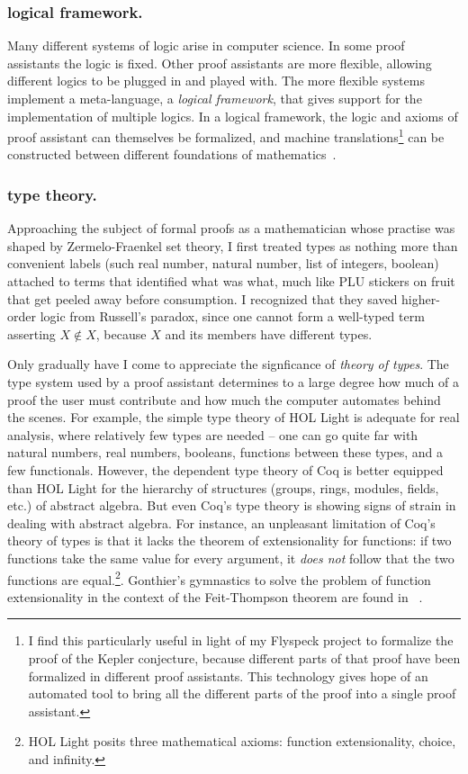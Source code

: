 \documentclass{llncs}
\begin{document}
\subsubsection{logical framework.} 
Many different systems of logic arise in computer science.  In some
proof assistants the logic is fixed. Other proof assistants are more
flexible, allowing different logics to be plugged in and played with.
The more flexible systems implement a meta-language, a {\it logical
  framework}, that gives support for the implementation of multiple
logics.  In a logical framework, the logic and axioms of proof
assistant can themselves be formalized, and machine
translations\footnote{I find this particularly useful in light of my
  Flyspeck project to formalize the proof of the Kepler conjecture,
  because different parts of that proof have been formalized in
  different proof assistants.  This technology gives hope of an
  automated tool to bring all the different parts of the proof into a
  single proof assistant.} can be constructed between different
foundations of mathematics~\cite{IRFF}.

\subsubsection{type theory.}

Approaching the subject of formal proofs as a mathematician whose
practise was shaped by Zermelo-Fraenkel set theory, I first treated
types as nothing more than convenient labels (such real number,
natural number, list of integers, boolean) attached to terms that
identified what was what, much like PLU stickers on fruit that get
peeled away before consumption.  I recognized that they saved higher-order
logic from Russell's paradox, since one cannot form a well-typed term
asserting $X \not\in X$, because $X$ and its members have different
types.

Only gradually have I come to appreciate the signficance of {\it
  theory of types}.  The type system used by a proof assistant
determines to a large degree how much of a proof the user must
contribute and how much the computer automates behind the scenes.  For
example, the simple type theory of HOL Light is adequate for real
analysis, where relatively few types are needed -- one can go quite
far with natural numbers, real numbers, booleans, functions between
these types, and a few functionals.  However, the dependent type
theory of Coq is better equipped than HOL Light for the hierarchy of
structures (groups, rings, modules, fields, etc.) of abstract algebra.
But even Coq's type theory is showing signs of strain in dealing with
abstract algebra.  For instance, an unpleasant limitation of Coq's
theory of types is that it lacks the theorem of extensionality for
functions: if two functions take the same value for every argument, it
{\it does not} follow that the two functions are equal.\footnote{HOL Light
  posits three mathematical axioms: function extensionality, choice,
  and infinity.}.  Gonthier's gymnastics to solve the problem of
function extensionality in the context of the Feit-Thompson theorem
are found in ~\cite{XX}.
\end{document}
